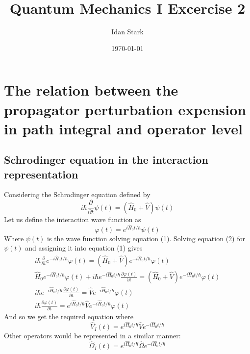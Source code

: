 \documentclass{article}
\title{Quantum Mechanics I Excercise 2}
\author{Idan Stark}
\date{\today}
\begin{document}
\maketitle

\section{The relation between the propagator perturbation expension in path integral and operator level}
\subsection{Schrodinger equation in the interaction representation}
Considering the Schrodinger equation defined by
\begin{equation}
    i\hbar \frac{\partial}{\partial t}\psi(t) = \left(\hat{H}_0 + \hat{V}\right)\psi(t)
\end{equation}
Let us define the interaction wave function as
\begin{equation}
    \varphi(t) = e^{i \hat{H}_0 t / \hbar}\psi(t)
\end{equation}
Where $\psi(t)$ is the wave function solving equation (1). Solving equation (2) for $\psi(t)$ and assigning it into equation (1) gives
\begin{equation}
\begin{gathered}
    i\hbar \frac{\partial}{\partial t}e^{-i \hat{H}_0 t / \hbar}\varphi(t) = \left(\hat{H}_0 + \hat{V}\right)e^{-i \hat{H}_0 t / \hbar}\varphi(t)
    \\
    \hat{H}_0 e^{-i \hat{H}_0 t / \hbar}\varphi(t) + i\hbar e^{-i \hat{H}_0 t / \hbar} \frac{\partial \varphi(t)}{\partial t} = \left(\hat{H}_0 + \hat{V}\right)e^{-i \hat{H}_0 t / \hbar}\varphi(t)
    \\
    i\hbar e^{-i \hat{H}_0 t / \hbar} \frac{\partial \varphi(t)}{\partial t} = \hat{V}e^{-i \hat{H}_0 t / \hbar}\varphi(t)
    \\
    i\hbar\frac{\partial \varphi(t)}{\partial t} = e^{i \hat{H}_0 t / \hbar}\hat{V}e^{-i \hat{H}_0 t / \hbar}\varphi(t)
\end{gathered}
\end{equation}
And so we get the required equation where
\begin{equation}
    \hat{V}_I(t) = e^{i \hat{H}_0 t / \hbar}\hat{V}e^{-i \hat{H}_0 t / \hbar}
\end{equation}
Other operators would be represented in a similar manner:
\begin{equation}
    \hat{\Omega}_I(t) = e^{i \hat{H}_0 t / \hbar}\hat{\Omega}e^{-i \hat{H}_0 t / \hbar}
\end{equation}
\end{document}
